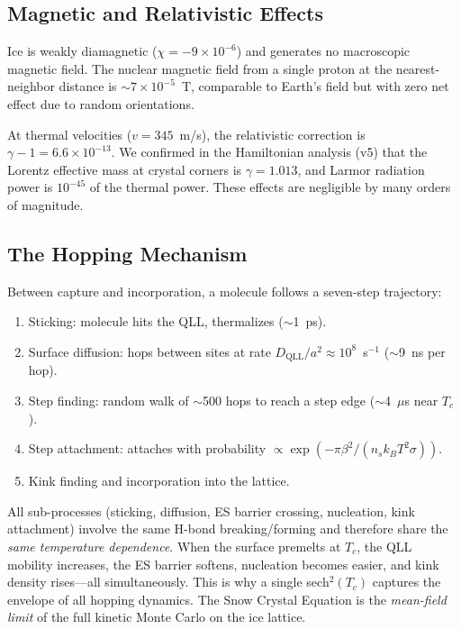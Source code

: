 \documentclass[12pt,letterpaper]{article}
\begin{document}
\subsection{Magnetic and Relativistic Effects}

Ice is weakly diamagnetic ($\chi = -9 \times 10^{-6}$) and generates no macroscopic magnetic field.  The nuclear magnetic field from a single proton at the nearest-neighbor distance is $\sim 7 \times 10^{-5}$~T, comparable to Earth's field but with zero net effect due to random orientations.

At thermal velocities ($v = 345$~m/s), the relativistic correction is $\gamma - 1 = 6.6 \times 10^{-13}$.  We confirmed in the Hamiltonian analysis (v5) that the Lorentz effective mass at crystal corners is $\gamma = 1.013$, and Larmor radiation power is $10^{-45}$ of the thermal power.  These effects are negligible by many orders of magnitude.

\subsection{The Hopping Mechanism}

Between capture and incorporation, a molecule follows a seven-step trajectory:
\begin{enumerate}[nosep]
\item Sticking: molecule hits the QLL, thermalizes ($\sim$1~ps).
\item Surface diffusion: hops between sites at rate $D_{\mathrm{QLL}}/a^2 \approx 10^8$~s$^{-1}$ ($\sim$9~ns per hop).
\item Step finding: random walk of $\sim$500 hops to reach a step edge ($\sim$4~$\mu$s near $T_c$).
\item Step attachment: attaches with probability $\propto \exp(-\pi\beta^2/(n_s k_B T^2 \sigma))$.
\item Kink finding and incorporation into the lattice.
\end{enumerate}

All sub-processes (sticking, diffusion, ES barrier crossing, nucleation, kink attachment) involve the same H-bond breaking/forming and therefore share the \emph{same temperature dependence}.  When the surface premelts at $T_c$, the QLL mobility increases, the ES barrier softens, nucleation becomes easier, and kink density rises---all simultaneously.  This is why a single sech$^2(T_c)$ captures the envelope of all hopping dynamics.  The Snow Crystal Equation is the \emph{mean-field limit} of the full kinetic Monte Carlo on the ice lattice.
\end{document}
